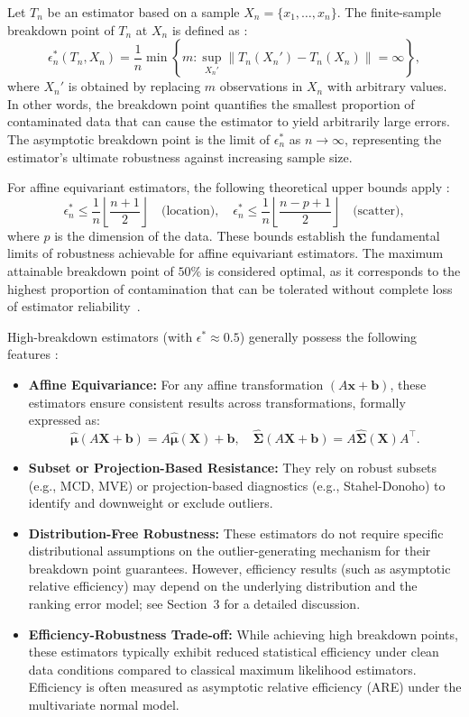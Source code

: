 \documentclass[12pt]{article}
\begin{document}
Let $T_n$ be an estimator based on a sample $X_n = \{x_1, \ldots, x_n\}$. The finite-sample breakdown point of $T_n$
at $X_n$ is defined as \cite{rousseeuw1999fast}:
\[
\epsilon^*_n(T_n, X_n) = \frac{1}{n} \min \left\{ m : \sup_{X_n'} \| T_n(X_n') - T_n(X_n) \| = \infty \right\},
\]
where $X_n'$ is obtained by replacing $m$ observations in $X_n$ with arbitrary values. In other words, the breakdown point quantifies the smallest proportion of contaminated data that can cause the estimator to yield arbitrarily large errors. The asymptotic breakdown point is the limit of $\epsilon^*_n$ as $n \to \infty$, representing the estimator’s ultimate robustness against increasing sample size.

For affine equivariant estimators, the following theoretical upper bounds apply \cite{maronna2019robust}:
\[
\epsilon^*_n \leq \frac{1}{n} \left\lfloor \frac{n + 1}{2} \right\rfloor \quad \text{(location)}, \quad \epsilon^*_n \leq \frac{1}{n} \left\lfloor \frac{n - p + 1}{2} \right\rfloor \quad \text{(scatter)},
\]
where $p$ is the dimension of the data. These bounds establish the fundamental limits of robustness achievable for affine equivariant estimators. The maximum attainable breakdown point of $50\%$ is considered optimal, as it corresponds to the highest proportion of contamination that can be tolerated without complete loss of estimator reliability~\cite{maronna2019robust}.

High-breakdown estimators (with $\epsilon^* \approx 0.5$)
generally possess the following features \cite{maronna2019robust}:
\begin{itemize}
    \item \textbf{Affine Equivariance:} For any affine transformation $(A \mathbf{x} + \mathbf{b})$, these estimators ensure consistent results across transformations, formally expressed as:
    \[
    \hat{\bm{\mu}}(A\mathbf{X} + \mathbf{b}) = A\hat{\bm{\mu}}(\mathbf{X}) + \mathbf{b}, \quad \hat{\bm{\Sigma}}(A\mathbf{X} + \mathbf{b}) = A\hat{\bm{\Sigma}}(\mathbf{X})A^\top.
    \]
    \item \textbf{Subset or Projection-Based Resistance:} They rely on robust subsets (e.g., MCD, MVE) or projection-based diagnostics (e.g., Stahel-Donoho) to identify and downweight or exclude outliers.
    \item \textbf{Distribution-Free Robustness:} These estimators do not require specific distributional assumptions on the outlier-generating mechanism for their breakdown point guarantees. However, efficiency results (such as asymptotic relative efficiency) may depend on the underlying distribution and the ranking error model; see Section~3 for a detailed discussion.
    \item \textbf{Efficiency-Robustness Trade-off:} While achieving high breakdown points, these estimators typically exhibit reduced statistical efficiency under clean data conditions compared to classical maximum likelihood estimators. Efficiency is often measured as asymptotic relative efficiency (ARE) under the multivariate normal model.
\end{itemize}
\end{document}
